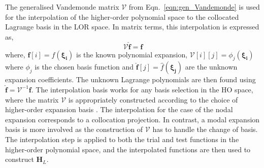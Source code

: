 The generalised Vandemonde matrix $\mathcal{V}$ from Eqn.~\eqref{eqn:gen_Vandemonde} is used for the interpolation of the higher-order polynomial space to the collocated Lagrange basis in the LOR space. In matrix terms, this interpolation is expressed as, 
\begin{equation}
    \mathcal{V} \hat{\mathbf{f}} = \mathbf{f}
    \label{eqn:gen_Vandemonde}
\end{equation}
where, $\mathbf{f} [i] = f (\mathbf{\xi_{i}})$ is the known polynomial expansion, $ \mathcal{V} [i][j] = {\phi_{j}} (\mathbf{\xi_{i}})$ where $\phi_{j}$ is the chosen basis function and $\hat{\mathbf{f}} [j] = \hat{f} (\mathbf{\xi_{j}})$ are the unknown expansion coefficients. The unknown Lagrange polynomials are then found using  $\hat{\mathbf{f}} = \mathcal{V}^{-1} \mathbf{f}$. The interpolation basis works for any basis selection in the HO space, where the matrix $\mathcal{V}$ is appropriately constructed according to the choice of higher-order expansion basis \cite{karniadakis2005spectral}. The interpolation for the case of the nodal expansion corresponds to a collocation projection. In contrast, a modal expansion basis is more involved as the construction of $\mathcal{V}$ has to handle the change of basis. The interpolation step is applied to both the trial and test functions in the higher-order polynomial space, and the interpolated functions are then used to construct $\mathbf{H}_{L}$.


